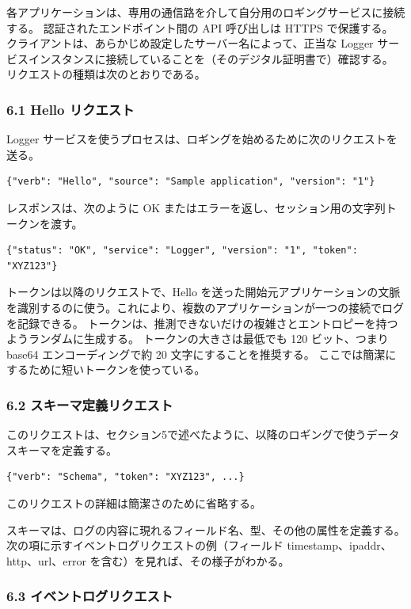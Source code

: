 \documentclass[uplatex]{jsarticle}
\begin{document}
各アプリケーションは、専用の通信路を介して自分用のロギングサービスに接続する。
認証されたエンドポイント間の API 呼び出しは HTTPS で保護する。
クライアントは、あらかじめ設定したサーバー名によって、正当な Logger サービスインスタンスに接続していることを（そのデジタル証明書で）確認する。
リクエストの種類は次のとおりである。

\subsubsection{6.1 Hello リクエスト}

Logger サービスを使うプロセスは、ロギングを始めるために次のリクエストを送る。
\begin{verbatim}
{"verb": "Hello", "source": "Sample application", "version": "1"}
\end{verbatim}
レスポンスは、次のように OK またはエラーを返し、セッション用の文字列トークンを渡す。
\begin{verbatim}
{"status": "OK", "service": "Logger", "version": "1", "token": "XYZ123"}
\end{verbatim}
トークンは以降のリクエストで、Hello を送った開始元アプリケーションの文脈を識別するのに使う。これにより、複数のアプリケーションが一つの接続でログを記録できる。
トークンは、推測できないだけの複雑さとエントロピーを持つようランダムに生成する。
トークンの大きさは最低でも 120 ビット、つまり base64 エンコーディングで約 20 文字にすることを推奨する。
ここでは簡潔にするために短いトークンを使っている。

\subsubsection{6.2 スキーマ定義リクエスト}

このリクエストは、セクション5で述べたように、以降のロギングで使うデータスキーマを定義する。
\begin{verbatim}
{"verb": "Schema", "token": "XYZ123", ...}
\end{verbatim}
このリクエストの詳細は簡潔さのために省略する。

スキーマは、ログの内容に現れるフィールド名、型、その他の属性を定義する。
次の項に示すイベントログリクエストの例（フィールド timestamp、ipaddr、http、url、error を含む）を見れば、その様子がわかる。

\subsubsection{6.3 イベントログリクエスト}
\end{document}
